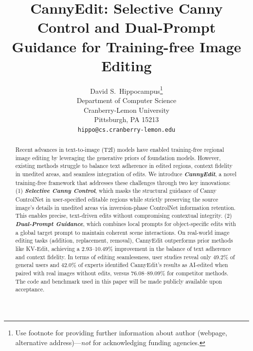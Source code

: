 \documentclass{article}
\title{CannyEdit: Selective Canny Control and Dual-Prompt Guidance for Training-free Image Editing}
\author{%
  David S.~Hippocampus\thanks{Use footnote for providing further information
    about author (webpage, alternative address)---\emph{not} for acknowledging
    funding agencies.} \\
  Department of Computer Science\\
  Cranberry-Lemon University\\
  Pittsburgh, PA 15213 \\
  \texttt{hippo@cs.cranberry-lemon.edu} \\
}
\begin{document}
\maketitle


\begin{abstract}
Recent advances in text-to-image (T2I) models have enabled training-free regional image editing by leveraging the generative priors of foundation models. However, existing methods struggle to balance text adherence in edited regions, context fidelity in unedited areas, and seamless integration of edits. We introduce \textbf{\textit{CannyEdit}}, a novel training-free framework that addresses these challenges through two key innovations: (1) \textbf{\textit{Selective Canny Control}}, which masks the structural guidance of Canny ControlNet in user-specified editable regions while strictly preserving the source image’s details in unedited areas via inversion-phase ControlNet information retention. This enables precise, text-driven edits without compromising contextual integrity. (2) \textbf{\textit{Dual-Prompt Guidance}}, which combines local prompts for object-specific edits with a global target prompt to maintain coherent scene interactions. On real-world image editing tasks (addition, replacement, removal), CannyEdit outperforms prior methods like KV-Edit, achieving a 2.93–10.49\% improvement in the balance of text adherence and context fidelity. In terms of editing seamlessness, user studies reveal only 49.2\% of general users and 42.0\% of experts identified CannyEdit's results as AI-edited when paired with real images without edits, versus 76.08–89.09\% for competitor methods. The code and benchmark used in this paper will be made publicly available upon acceptance.
\end{abstract}
\end{document}

